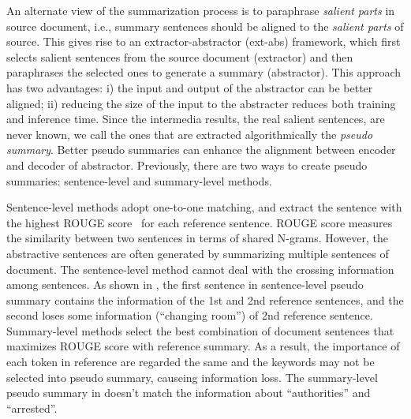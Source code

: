 An alternate view of the summarization process is 
to
paraphrase
\textit{salient parts} in source document, i.e.,
summary sentences should be aligned to the \textit{salient parts} of source.
This gives rise to an extractor-abstractor (ext-abs) framework,
which first selects salient sentences from the source document (extractor) and then 
paraphrases the selected ones to generate a summary (abstractor). 
This approach has two advantages: i) the input and output
of the abstractor can be better aligned;
ii) reducing the size of the input to the abstracter reduces both training and
inference time.
Since the intermedia results, the real salient
sentences, are never known, we call the ones that are extracted algorithmically the
{\em pseudo summary}. 
Better pseudo summaries can enhance the alignment between 
encoder and decoder of abstractor.
Previously, there are two ways to create pseudo summaries: 
sentence-level and summary-level methods.

Sentence-level methods \cite{FastAbs18} adopt one-to-one matching, 
and extract the sentence with the highest ROUGE score~\cite{rouge}  
for each reference sentence.
ROUGE score measures the similarity between two sentences in terms of shared
N-grams. However, the abstractive sentences are often generated by summarizing multiple sentences of document.
The sentence-level method cannot deal with the crossing information among sentences.
As shown in , the first sentence in sentence-level pseudo summary 
contains the information of the 1st and 2nd reference sentences, 
and the second loses some information (``changing room'') of 2nd reference 
sentence.
Summary-level methods \cite{NallapatiAAAI17, SharmaHHW19}
select the best combination of document sentences
that maximizes ROUGE score with reference summary. 
As a result, the importance of each token in reference are regarded the same and
the keywords may not be selected into pseudo summary, causeing information loss.
The summary-level pseudo summary in  doesn't
match the information about ``authorities'' and ``arrested''.

